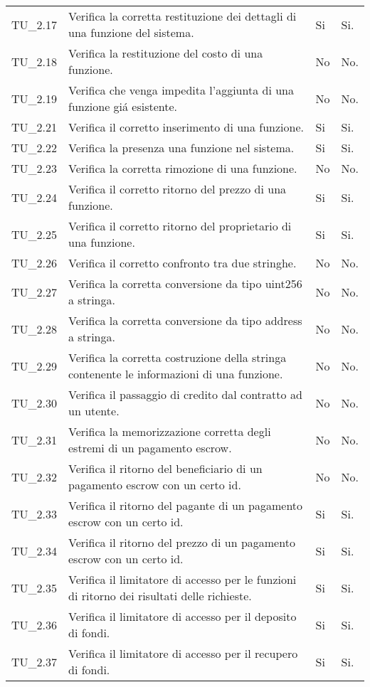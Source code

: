 \begin{longtable}{
		>{\centering}p{}
		>{}p{}
		>{\centering}p{}
		>{\centering}p{} }
		TU_2.17  &  Verifica la corretta restituzione dei dettagli di una funzione del sistema. &
		Si & Si. \tabularnewline

		TU_2.18  &  Verifica la restituzione del costo di una funzione. &
		No & No. \tabularnewline

		TU_2.19  &  Verifica che venga impedita l'aggiunta di una funzione giá esistente. &
		No & No. \tabularnewline

		TU_2.21  &  Verifica il corretto inserimento di una funzione. &%
		Si & Si. \tabularnewline

		TU_2.22  &  Verifica la presenza una funzione nel sistema.	&
		 Si & Si. \tabularnewline

		TU_2.23  &  Verifica la corretta rimozione di una funzione. &
		No & No. \tabularnewline

		TU_2.24  &  Verifica il corretto ritorno del prezzo di una funzione. &
		Si & Si. \tabularnewline

		TU_2.25  &  Verifica il corretto ritorno del proprietario di una funzione. &
		Si & Si. \tabularnewline

		TU_2.26  &  Verifica il corretto confronto tra due stringhe. &
		No & No. \tabularnewline

		TU_2.27  &  Verifica la corretta conversione da tipo uint256 a stringa. &
		No & No. \tabularnewline

		TU_2.28  &  Verifica la corretta conversione da tipo address a stringa. &
		No & No. \tabularnewline

		TU_2.29  &  Verifica la corretta costruzione della stringa contenente le informazioni di una funzione. &
		No & No. \tabularnewline

		TU_2.30  &  Verifica il passaggio di credito dal contratto ad un utente. & %
		No & No. \tabularnewline

		TU_2.31  &  Verifica la memorizzazione corretta degli estremi di un pagamento escrow. &
		No & No. \tabularnewline

		TU_2.32  &  Verifica il ritorno del beneficiario di un pagamento escrow con un certo id. &
		No & No. \tabularnewline

		TU_2.33  &  Verifica il ritorno del pagante di un pagamento escrow con un certo id.  &
		Si & Si. \tabularnewline

		TU_2.34  &  Verifica il ritorno del prezzo di un pagamento escrow con un certo id.  &
		Si & Si. \tabularnewline

		TU_2.35  &  Verifica il limitatore di accesso per le funzioni di ritorno dei risultati delle richieste.	&
		 Si & Si. \tabularnewline

		TU_2.36  &  Verifica il limitatore di accesso per il deposito di fondi.	&
		 Si & Si. \tabularnewline

		TU_2.37  &  Verifica il limitatore di accesso per il recupero di fondi.	&
		 Si & Si. \tabularnewline




\end{longtable}
